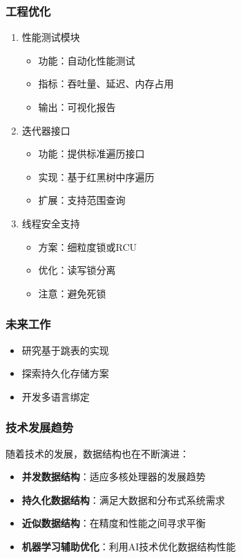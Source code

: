\documentclass[12pt,a4paper]{article}
\begin{document}
\subsubsection{工程优化}
\begin{enumerate}
\item 性能测试模块
\begin{itemize}
\item 功能：自动化性能测试
\item 指标：吞吐量、延迟、内存占用
\item 输出：可视化报告
\end{itemize}

\item 迭代器接口
\begin{itemize}
\item 功能：提供标准遍历接口
\item 实现：基于红黑树中序遍历
\item 扩展：支持范围查询
\end{itemize}

\item 线程安全支持
\begin{itemize}
\item 方案：细粒度锁或RCU
\item 优化：读写锁分离
\item 注意：避免死锁
\end{itemize}
\end{enumerate}

\subsubsection{未来工作}
\begin{itemize}
\item 研究基于跳表的实现
\item 探索持久化存储方案
\item 开发多语言绑定
\end{itemize}

\subsubsection{技术发展趋势}
随着技术的发展，数据结构也在不断演进：
\begin{itemize}
\item \textbf{并发数据结构}：适应多核处理器的发展趋势
\item \textbf{持久化数据结构}：满足大数据和分布式系统需求
\item \textbf{近似数据结构}：在精度和性能之间寻求平衡
\item \textbf{机器学习辅助优化}：利用AI技术优化数据结构性能
\end{itemize}
\end{document}
